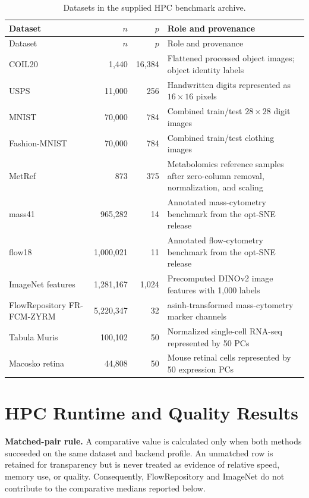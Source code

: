 \documentclass[twoside,11pt]{article}
\begin{document}
\begin{longtable}{p{}rrp{}}
\caption{Datasets in the supplied HPC benchmark archive.}\label{tab:datasets}\\
\toprule
Dataset & $n$ & $p$ & Role and provenance\\
\midrule
\endfirsthead
\toprule
Dataset & $n$ & $p$ & Role and provenance\\
\midrule
\endhead
COIL20 & 1,440 & 16,384 & Flattened processed object images; object identity labels\\
USPS & 11,000 & 256 & Handwritten digits represented as $16\times16$ pixels\\
MNIST & 70,000 & 784 & Combined train/test $28\times28$ digit images \citep{lecun1998}\\
Fashion-MNIST & 70,000 & 784 & Combined train/test clothing images \citep{xiao2017}\\
MetRef & 873 & 375 & Metabolomics reference samples after zero-column removal, normalization, and scaling\\
mass41 & 965,282 & 14 & Annotated mass-cytometry benchmark from the opt-SNE release\\
flow18 & 1,000,021 & 11 & Annotated flow-cytometry benchmark from the opt-SNE release\\
ImageNet features & 1,281,167 & 1,024 & Precomputed DINOv2 image features with 1,000 labels \citep{oquab2024}\\
FlowRepository FR-FCM-ZYRM & 5,220,347 & 32 & asinh-transformed mass-cytometry marker channels\\
Tabula Muris & 100,102 & 50 & Normalized single-cell RNA-seq represented by 50 PCs \citep{tabulamuris2018}\\
Macosko retina & 44,808 & 50 & Mouse retinal cells represented by 50 expression PCs \citep{macosko2015}\\
\bottomrule
\end{longtable}

\section{HPC Runtime and Quality Results}

\noindent\textbf{Matched-pair rule.} A comparative value is calculated only
when both methods succeeded on the same dataset and backend profile. An
unmatched row is retained for transparency but is never treated as evidence
of relative speed, memory use, or quality. Consequently, FlowRepository and
ImageNet do not contribute to the comparative medians reported below.
\end{document}
